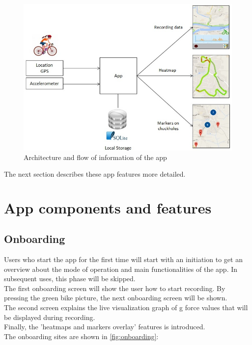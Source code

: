 \documentclass[10pt,a4paper]{article} %
\begin{document}
	\begin{figure}[H]
	\centering
    	\includegraphics[scale = 0.8]{pic1}
    	\caption{Architecture and flow of information of the app }
	\label{fig:arch_flow}
    	\end{figure}
    
	\noindent
	The next section describes these app features more detailed.
    
    \section{App components and features}
    
    
    \subsection{Onboarding}
    	Users who start the app for the first time will start with an initiation to get an overview about the mode of operation and main functionalities of the app. In subsequent uses, this phase will be skipped.\\
    	The first onboarding screen will show the user how to start recording. By pressing the green bike picture, the next onboarding screen will be shown. \\
    	The second screen explains the live visualization graph of g force values that will be displayed during recording.\\
    	Finally, the 'heatmaps and markers overlay' features is introduced.\\
	The onboarding sites are shown in \autoref{fig:onboarding}:
    
\end{document}
